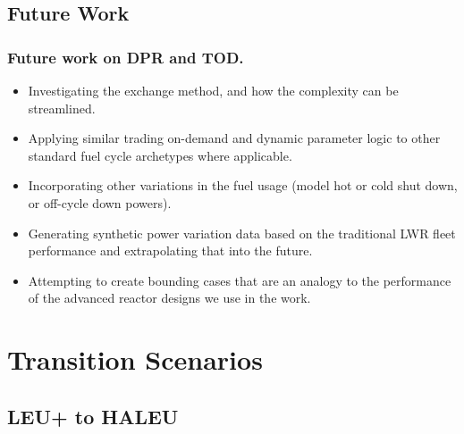 \documentclass[9pt]{beamer}
\begin{document}
\subsection{Future Work}
\begin{frame}
  \frametitle{Future work on DPR and TOD.}
  \begin{itemize}
    \item Investigating the exchange method, and how the complexity can be streamlined.
    \item Applying similar trading on-demand and dynamic parameter logic to other standard fuel cycle archetypes where applicable.
    \item Incorporating other variations in the fuel usage (model hot or cold shut down, or off-cycle down powers).
    \item Generating synthetic power variation data based on the traditional LWR fleet performance and extrapolating that into the future.
    \item Attempting to create bounding cases that are an analogy to the performance of the advanced reactor designs we use in the work.
  \end{itemize}
\end{frame}

\section{Transition Scenarios}
  \subsection{LEU+ to HALEU}
\end{document}
